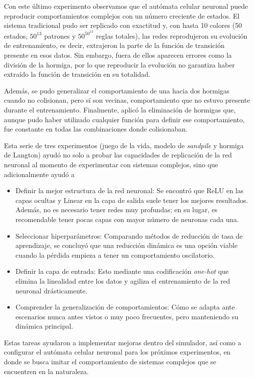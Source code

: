 Con este último experimento observamos que el autómata celular neuronal puede reproducir comportamientos complejos con un número creciente de estados. El sistema tradicional pudo ser replicado con exactitud y, con hasta 10 colores (50 estados, $50^{13}$ patrones y $50^{50^{13}}$ reglas totales), las redes reprodujeron su evolución de entrenamiento, es decir, extrajeron la parte de la función de transición presente en esos datos. Sin embargo, fuera de ellos aparecen errores como la división de la hormiga, por lo que reproducir la evolución no garantiza haber extraído la función de transición en su totalidad.

Además, se pudo generalizar el comportamiento de una hacia dos hormigas cuando no colisionan, pero sí son vecinas, comportamiento que no estuvo presente durante el entrenamiento. Finalmente, aplicó la eliminación de hormigas que, aunque pudo haber utilizado cualquier función para definir ese comportamiento, fue constante en todas las combinaciones donde colisionaban.

Esta serie de tres experimentos (juego de la vida, modelo de \textit{sandpile} y hormiga de Langton) ayudó no solo a probar las capacidades de replicación de la red neuronal al momento de experimentar con sistemas complejos, sino que adicionalmente ayudó a 
\begin{itemize}
	\item Definir la mejor estructura de la red neuronal: Se encontró que ReLU en las capas ocultas y Linear en la capa de salida suele tener los mejores resultados. Además, no es necesario tener redes muy profundas; en su lugar, es recomendable tener pocas capas con mayor número de neuronas cada una. 

	\item Seleccionar hiperparámetros: Comparando métodos de reducción de tasa de aprendizaje, se concluyó que una reducción dinámica es una opción viable cuando la pérdida empieza a tener un comportamiento oscilatorio. 

	\item Definir la capa de entrada: Esto mediante una codificación \textit{one-hot} que elimina la linealidad entre los datos y agiliza el entrenamiento de la red neuronal drásticamente. 
	
	\item Comprender la generalización de comportamientos: Cómo se adapta ante escenarios nunca antes vistos o muy poco frecuentes, pero manteniendo su dinámica principal.
\end{itemize}

Estas tareas ayudaron a implementar mejoras dentro del simulador, así como a configurar el autómata celular neuronal para los próximos experimentos, en donde se busca imitar el comportamiento de sistemas complejos que se encuentren en la naturaleza.
